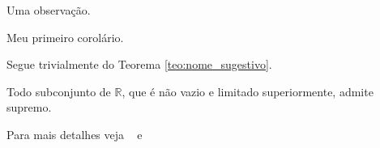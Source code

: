 \begin{obs}
  Uma observação.
\end{obs}

\begin{coro}
  Meu primeiro corolário.
\end{coro}

\begin{dem}
  Segue trivialmente do Teorema \ref{teo:nome_sugestivo}.
\end{dem}

\begin{axioma}
  Todo subconjunto de $\mathbb{R}$, que é não vazio e limitado
  superiormente, admite supremo.
\end{axioma}

Para mais detalhes veja ~\cite[p. nn]{Lvr} e ~\cite{Art}

